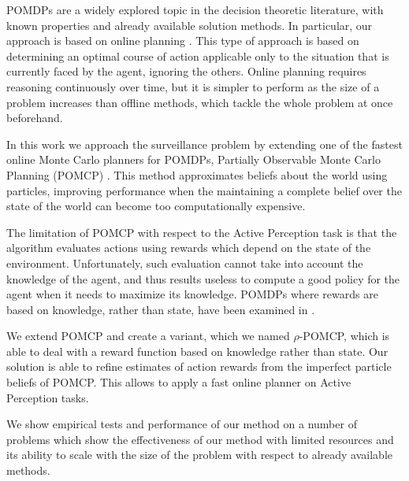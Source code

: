 POMDPs are a widely explored topic in the decision theoretic literature, with known properties and
already available solution methods. In particular, our approach is based on online planning
\cite{cit:relworkonlineall}. This type of approach is based on determining an optimal course of
action applicable only to the situation that is currently faced by the agent, ignoring the others.
Online planning requires reasoning continuously over time, but it is simpler to perform as the size
of a problem increases than offline methods, which tackle the whole problem at once beforehand.


In this work we approach the surveillance problem by extending one of the fastest online Monte Carlo
planners for POMDPs, Partially Observable Monte Carlo Planning (POMCP) \cite{cit:pomcp}. This
method approximates beliefs about the world using particles, improving performance when the
maintaining a complete belief over the state of the world can become too computationally expensive.

The limitation of POMCP with respect to the Active Perception task is that the algorithm evaluates
actions using rewards which depend on the state of the environment. Unfortunately, such evaluation
cannot take into account the knowledge of the agent, and thus results useless to compute a good
policy for the agent when it needs to maximize its knowledge. POMDPs where rewards are based on
knowledge, rather than state, have been examined in \cite{cit:rpomdp}.


We extend POMCP and create a variant, which we named $\rho$-POMCP, which is able to deal with a
reward function based on knowledge rather than state. Our solution is able to refine estimates of
action rewards from the imperfect particle beliefs of POMCP. This allows to apply a fast online
planner on Active Perception tasks.


We show empirical tests and performance of our method on a number of problems which show the
effectiveness of our method with limited resources and its ability to scale with the size of the
problem with respect to already available methods.

